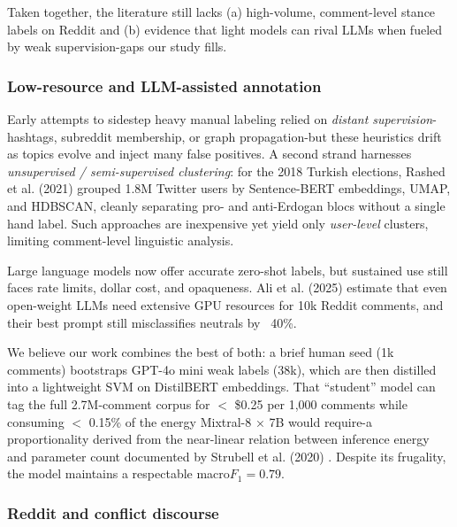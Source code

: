 \documentclass[letterpaper]{article} %
\begin{document}
Taken together, the literature still lacks (a) high-volume, comment-level stance labels on Reddit and (b) evidence that light models can rival LLMs when fueled by weak supervision-gaps our study fills.

\subsubsection{Low-resource and LLM-assisted annotation}
Early attempts to sidestep heavy manual labeling relied on \emph{distant supervision}-hashtags, subreddit membership, or graph propagation-but these heuristics drift as topics evolve and inject many false positives.  A second strand harnesses \emph{unsupervised / semi-supervised clustering}: for the 2018 Turkish elections, Rashed et al. (2021) \cite{rashed2021embeddings} grouped 1.8M Twitter users by Sentence-BERT embeddings, UMAP, and HDBSCAN, cleanly separating pro- and anti-Erdogan blocs without a single hand label.  Such approaches are inexpensive yet yield only \textit{user-level} clusters, limiting comment-level linguistic analysis.

Large language models now offer accurate zero-shot labels, but sustained use still faces rate limits, dollar cost, and opaqueness.  Ali et al. (2025) \cite{ali2025social} estimate that even open-weight LLMs need extensive GPU resources for 10k Reddit comments, and their best prompt still misclassifies neutrals by ~40\%. 

We believe our work combines the best of both: a brief human seed (1k comments) bootstraps GPT-4o mini weak labels (38k), which are then distilled into a lightweight SVM on DistilBERT embeddings. That “student” model can tag the full 2.7M-comment corpus for $<$ \$0.25 per 1,000 comments while consuming $<$ 0.15\% of the energy Mixtral-8 × 7B would require-a proportionality derived from the near-linear relation between inference energy and parameter count documented by Strubell et al. (2020) \cite{strubell2020energy}. Despite its frugality, the model maintains a respectable macro\(F_{1}=0.79\).

\subsubsection{Reddit and conflict discourse}
\end{document}
